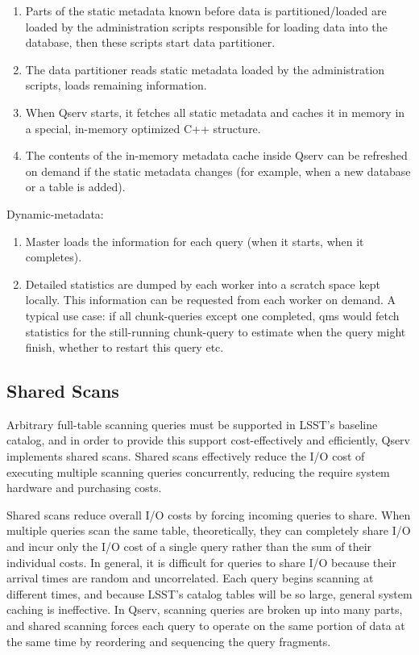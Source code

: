 \documentclass[DM,toc]{lsstdoc}
\begin{document}
\begin{enumerate}
\def\labelenumi{\arabic{enumi}.}
\item
  Parts of the static metadata known before data is partitioned/loaded
  are loaded by the administration scripts responsible for loading data
  into the database, then these scripts start data partitioner.
\item
  The data partitioner reads static metadata loaded by the
  administration scripts, loads remaining information.
\item
  When Qserv starts, it fetches all static metadata and caches it in
  memory in a special, in-memory optimized C++ structure.
\item
  The contents of the in-memory metadata cache inside Qserv can be
  refreshed on demand if the static metadata changes (for example, when
  a new database or a table is added).
\end{enumerate}

Dynamic-metadata:

\begin{enumerate}
\def\labelenumi{\arabic{enumi}.}
\item
  Master loads the information for each query (when it starts, when it
  completes).
\item
  Detailed statistics are dumped by each worker into a scratch space
  kept locally. This information can be requested from each worker on
  demand. A typical use case: if all chunk-queries except one completed,
  qms would fetch statistics for the still-running chunk-query to
  estimate when the query might finish, whether to restart this query
  etc.
\end{enumerate}

\subsection{Shared Scans}\label{shared-scans}

Arbitrary full-table scanning queries must be supported in LSST's
baseline catalog, and in order to provide this support cost-effectively
and efficiently, Qserv implements shared scans. Shared scans effectively
reduce the I/O cost of executing multiple scanning queries
concurrently, reducing the require system hardware and purchasing costs.

Shared scans reduce overall I/O costs by forcing incoming queries to
share. When multiple queries scan the same table, theoretically, they
can completely share I/O and incur only the I/O cost of a single query
rather than the sum of their individual costs. In general, it is
difficult for queries to share I/O because their arrival times are
random and uncorrelated. Each query begins scanning at different times,
and because LSST's catalog tables will be so large, general system
caching is ineffective. In Qserv, scanning queries are broken up into
many parts, and shared scanning forces each query to operate on the same
portion of data at the same time by reordering and sequencing the query
fragments.
\end{document}
